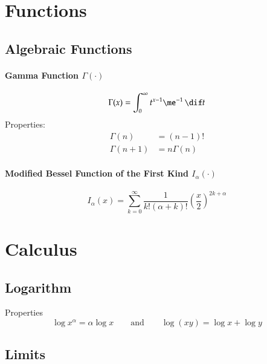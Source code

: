 \documentclass[a4paper]{article}
\numberwithin{equation}{subsection}
\begin{document}
\newpage

\section{Functions}
\label{sec:functions}

\subsection{Algebraic Functions}

\paragraph{Gamma Function $\Gamma(\cdot)$}
\begin{equation}
  \Gamma(x) = \int_{0}^{\infty} t^{x-1} \me^{-1}\,\dif t
\end{equation}
Properties:
\begin{align}
  \Gamma(n) &= (n-1)!
  \\
  \Gamma(n+1) &= n \Gamma(n)
\end{align}

\paragraph{Modified Bessel Function of the First Kind $I_{\alpha}(\cdot)$}
\label{sec:modified_bessel_function}
\begin{equation}
  I_{\alpha}(x) =
  \sum_{k=0}^{\infty} 
  \frac{1}{k! (\alpha + k)!}
  \left( \frac{x}{2} \right)^{2k + \alpha}
\end{equation}


\newpage
\section{Calculus}
\label{sec:calculus}

\subsection{Logarithm}

Properties
\begin{equation}
  \log x^\alpha = \alpha \log x 
  \qquad
  \text{and}
  \qquad
  \log( xy) = \log x + \log y
\end{equation}


\subsection{Limits}
\label{sec:limits}
\end{document}
